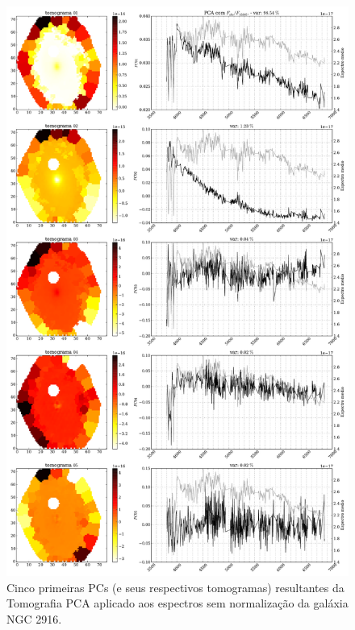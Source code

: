 \begin{figure}
    \includegraphics[height=1.\textheight]{figuras/K0277-tomo-obs.pdf}
    \caption[Tomogramas de 1 a 5 da gal\'axia NGC 2916 - $F_{obs}$.]
    {Cinco primeiras PCs (e seus respectivos tomogramas) resultantes da Tomografia PCA aplicado aos espectros sem
    normalização da galáxia NGC 2916.}
    \label{fig:UsoPCA:K277tomofobs}
\end{figure}
